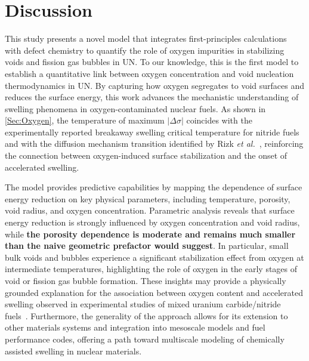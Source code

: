 \documentclass[preprint,12pt,sort&compress]{elsarticle}
\newcommand{\?}{\stackrel{?}{=}}
\providecommand{\DIFaddtex}[1]{{\bf #1}} %
\providecommand{\DIFdeltex}[1]{} %
\providecommand{\DIFaddbegin}{\protect\color{blue}} %
\providecommand{\DIFaddend}{\protect\color{black}} %
\providecommand{\DIFdelbegin}{\protect\color{red}} %
\providecommand{\DIFdelend}{\protect\color{black}} %
\providecommand{\DIFadd}[1]{\texorpdfstring{\DIFaddtex{#1}}{#1}} %
\providecommand{\DIFdel}[1]{\texorpdfstring{\DIFdeltex{#1}}{}} %
\begin{document}
\section{Discussion}
\label{Sec:Discuss}

This study presents a novel model that integrates first-principles calculations with defect chemistry to quantify the role of oxygen impurities in stabilizing voids and fission gas bubbles in UN. To our knowledge, this is the first model to establish a quantitative link between oxygen concentration and void nucleation thermodynamics in UN. By capturing how oxygen segregates to void surfaces and reduces the surface energy, this work advances the mechanistic understanding of swelling phenomena in oxygen-contaminated nuclear fuels. As shown in \cref{Sec:Oxygen}, the temperature of maximum $|\Delta \sigma|$ coincides with the experimentally reported breakaway swelling critical temperature for nitride fuels~\cite{Ronchi1978} and with the diffusion mechanism transition identified by Rizk \textit{et al.}~\cite{Rizk2025}, reinforcing the connection between oxygen-induced surface stabilization and the onset of accelerated swelling.


The model provides predictive capabilities by mapping the dependence of surface energy reduction on key physical parameters, including temperature, porosity, void radius, and oxygen concentration. Parametric analysis reveals that surface energy reduction is strongly influenced by oxygen concentration and void radius, while \DIFdelbegin \DIFdel{being weakly dependent on porosity }\DIFdelend \DIFaddbegin \DIFadd{the porosity dependence is moderate and remains much smaller than the naive geometric prefactor would suggest}\DIFaddend . In particular, small bulk voids and bubbles experience a significant stabilization effect from oxygen at intermediate temperatures, highlighting the role of oxygen in the early stages of void or fission gas bubble formation. These insights may provide a physically grounded explanation for the association between oxygen content and accelerated swelling observed in experimental studies of mixed uranium carbide/nitride fuels~\cite{Rogozkin2003}. Furthermore, the generality of the approach allows for its extension to other materials systems and integration into mesoscale models and fuel performance codes, offering a path toward multiscale modeling of chemically assisted swelling in nuclear materials.
\end{document}
